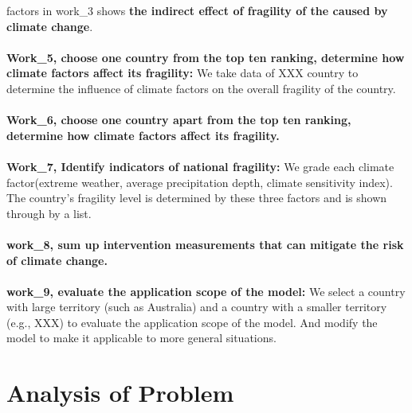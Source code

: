 \documentclass{mcmthesis}
\begin{document}
  factors in work\_3 shows \textbf{the indirect effect of fragility of the caused by 
  climate change}.\\\\
  \textbf{Work\_5, choose one country from the top ten ranking, determine how climate 
  factors affect its fragility:} We take data of XXX country to determine the 
  influence of climate factors on the overall fragility of the country.\\\\ 
  \textbf{Work\_6, choose one country apart from the top ten ranking, determine how 
  climate factors affect its fragility.}\\\\
  \textbf{Work\_7, Identify indicators of national fragility:} We grade each 
  climate factor(extreme weather, average precipitation depth, climate 
  sensitivity index). The country's fragility level is determined 
  by these three factors and is shown through by a list.\\\\
  \textbf{work\_8, sum up intervention measurements that can mitigate the risk of climate change.}\\\\
  \textbf{work\_9, evaluate the application scope of the model:} We select a country with large 
  territory (such as Australia) and a country with a smaller territory (e.g., 
  XXX) to evaluate the application scope of the model. And modify the model 
  to make it applicable to more general situations.
\section{Analysis of Problem}
\end{document}
